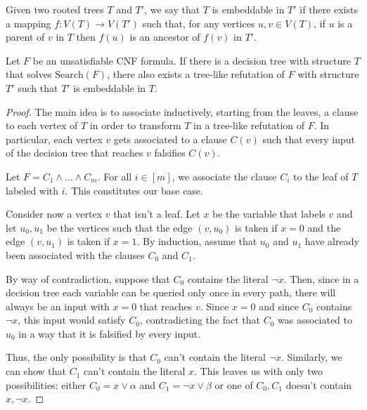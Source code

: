\begin{definition}
Given two rooted trees $T$ and $T'$, we say that $T$ is embeddable in $T'$ if there exists a mapping $f : V(T) \to V(T')$ such that, for any vertices $u,v \in V(T)$, if $u$ is a parent of $v$ in $T$ then $f(u)$ is an ancestor of $f(v)$ in $T'$.
\end{definition}

\begin{lemma} \label{lem:dt_treeres}
    \cite{treelike_res_size,search_problems_dt_model}
    Let $F$ be an unsatisfiable CNF formula. If there is a decision tree with structure $T$ that solves $\mathrm{Search}(F)$, there also exists a tree-like refutation of $F$ with structure $T'$ such that $T'$ is embeddable in $T$.
\end{lemma}

\begin{proof}

    The main idea is to associate inductively, starting from the leaves, a clause to each vertex of $T$ in order to transform $T$ in a tree-like refutation of $F$. In particular, each vertex $v$ gets associated to a clause $C(v)$ such that every input of the decision tree that reaches $v$ falsifies $C(v)$.

    Let $F = C_1 \land \ldots \land C_m$. For all $i \in [m]$, we associate the clause $C_i$ to the leaf of $T$ labeled with $i$. This constitutes our base case.

    Consider now a vertex $v$ that isn't a leaf. Let $x$ be the variable that labels $v$ and let $u_0, u_1$ be the vertices such that the edge $(v, u_0)$ is taken if $x = 0$ and the edge $(v, u_1)$ is taken if $x = 1$.  By induction, assume that $u_0$ and $u_1$ have already been associated with the clauses $C_0$ and $C_1$.

    By way of contradiction, suppose that $C_0$ contains the literal $\lnot{x}$. Then, since in a decision tree each variable can be queried only once in every path, there will always be an input with $x = 0$ that reaches $v$. Since $x = 0$ and since $C_0$ contains $\lnot{x}$, this input would satisfy $C_0$, contradicting the fact that $C_0$ was associated to $u_0$ in a way that it is falsified by every input.

    Thus, the only possibility is that $C_0$ can't contain the literal $\lnot{x}$. Similarly, we can show that $C_1$ can't contain the literal $x$. This leaves us with only two possibilities: either $C_0 = x \lor \alpha$ and $C_1 = \lnot{x} \lor \beta$ or one of $C_0, C_1$ doesn't contain $x, \lnot{x}$.


\end{proof}
